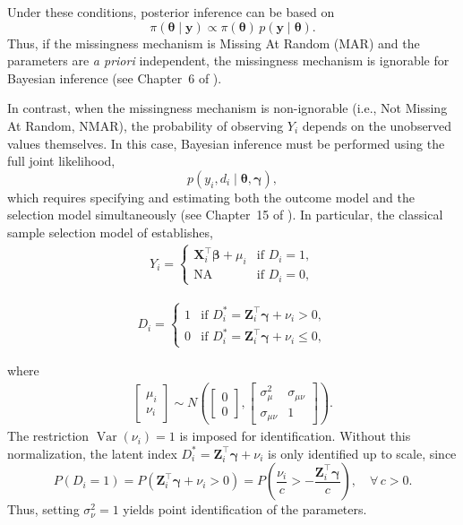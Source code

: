 Under these conditions, posterior inference can be based on
\[
\pi(\boldsymbol{\theta}\mid \mathbf{y}) 
\propto \pi(\boldsymbol{\theta})\, p(\mathbf{y} \mid \boldsymbol{\theta}).
\]
Thus, if the missingness mechanism is Missing At Random (MAR) and the parameters are \emph{a priori} independent, the missingness mechanism is ignorable for Bayesian inference (see Chapter~6 of \cite{little2019statistical}).

In contrast, when the missingness mechanism is non-ignorable (i.e., Not Missing At Random, NMAR), the probability of observing $Y_i$ depends on the unobserved values themselves. In this case, Bayesian inference must be performed using the full joint likelihood,
\[
p(y_i, d_i \mid \boldsymbol{\theta},\boldsymbol{\gamma}),
\]
which requires specifying and estimating both the outcome model and the selection model simultaneously (see Chapter~15 of \cite{little2019statistical}). In particular, the classical sample selection model of \cite{heckman1979sample} establishes,
\begin{align*}
	Y_i = \begin{cases}
		\mathbf{X}_i^{\top}\boldsymbol{\beta}+\mu_i & \text{if } D_i=1, \\
		\text{NA} & \text{if } D_i=0,
	\end{cases}
\end{align*}

\begin{align*}
	D_i = \begin{cases}
		1 & \text{if } D_i^* = \mathbf{Z}_i^{\top}\boldsymbol{\gamma}+\nu_i > 0, \\
		0 & \text{if } D_i^* = \mathbf{Z}_i^{\top}\boldsymbol{\gamma}+\nu_i \leq 0,
	\end{cases}
\end{align*}

where
\begin{align}
	\begin{bmatrix}
		\mu_i \\[6pt]
		\nu_i
	\end{bmatrix}
	\sim N\!\left(
	\begin{bmatrix}
		0 \\ 0
	\end{bmatrix},
	\begin{bmatrix}
		\sigma^2_{\mu} & \sigma_{\mu\nu} \\
		\sigma_{\mu\nu} & 1
	\end{bmatrix}\right).
\end{align}
The restriction $\operatorname{Var}(\nu_i)=1$ is imposed for identification. 
Without this normalization, the latent index $D_i^*=\mathbf{Z}_i^{\top}\boldsymbol{\gamma}+\nu_i$ is only identified up to scale, since
\[
P(D_i=1) = P(\mathbf{Z}_i^{\top}\boldsymbol{\gamma}+\nu_i > 0) 
= P\!\left(\frac{\nu_i}{c} > -\frac{\mathbf{Z}_i^{\top}\boldsymbol{\gamma}}{c}\right),
\quad \forall\, c>0.
\]
Thus, setting $\sigma^2_{\nu}=1$ yields point identification of the parameters.

